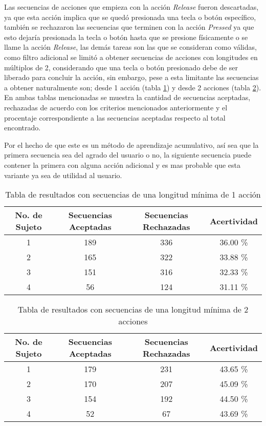 Las secuencias de acciones que empieza con la acci\'on \emph{Release} fueron descartadas, ya que esta acci\'on implica que se qued\'o presionada una tecla o bot\'on espec\'ifico, tambi\'en se rechazaron las secuencias que terminen con la acci\'on \emph{Pressed} ya que esto dejar\'ia presionada la tecla o bot\'on hasta que se presione f\'isicamente o se llame la acci\'on \emph{Release}, las dem\'as tareas son las que se consideran como v\'alidas, como filtro adicional se limit\'o a obtener secuencias de acciones con longitudes en m\'ultiplos de 2, considerando que una tecla o bot\'on presionado debe de ser liberado para concluir la acci\'on, sin embargo, pese a esta limitante las secuencias a obtener naturalmente son; desde 1 acci\'on (tabla \ref{tableRes1}) y desde 2 acciones (tabla \ref{tableRes2}). En ambas tablas mencionadas se muestra la cantidad de secuencias aceptadas, rechazadas de acuerdo con los criterios mencionados anteriormente y el procentaje correspondiente a las secuencias aceptadas respecto al total encontrado.

Por el hecho de que este es un m\'etodo de aprendizaje acumulativo, as\'i sea que la primera secuencia sea del agrado del usuario o no, la siguiente secuencia puede contener la primera con alguna acci\'on adicional y es mas probable que esta variante ya sea de utilidad al usuario. 


\begin{table}[]
\centering
\begin{tabular}{cccc}
\hline
		No. de Sujeto	&	Secuencias Aceptadas	&   Secuencias Rechazadas	&	Acertividad		\\ \hline
		1				&	189						&	336						&	36.00 \%		\\
		2				&	165						&	322						&	33.88 \%		\\
		3				&	151						&	316						&	32.33 \%		\\
		4				&	56						&	124						&	31.11 \%		\\
\hline
\end{tabular}
\caption{Tabla de resultados con secuencias de una longitud m\'inima de 1 acci\'on}
\label{tableRes1}
\end{table}



\begin{table}[]
\centering
\begin{tabular}{cccc}
\hline
		No. de Sujeto	&	Secuencias Aceptadas	&   Secuencias Rechazadas	&	Acertividad		\\ \hline
		1				&	179						&	231						&	43.65 \%		\\
		2				&	170						&	207						&	45.09 \%		\\
		3				&	154						&	192						&	44.50 \%		\\
		4				&	52						&	67						&	43.69 \%		\\
\hline
\end{tabular}
\caption{Tabla de resultados con secuencias de una longitud m\'inima de 2 acciones}
\label{tableRes2}
\end{table}


